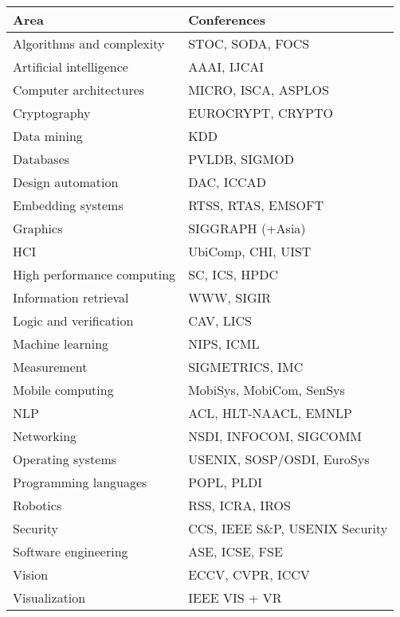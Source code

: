 \begin{tabular}{ll}
\toprule
                       Area &                     Conferences \\
\midrule
  Algorithms and complexity &                STOC, SODA, FOCS \\
    Artificial intelligence &                     AAAI, IJCAI \\
     Computer architectures &             MICRO, ISCA, ASPLOS \\
               Cryptography &               EUROCRYPT, CRYPTO \\
                Data mining &                             KDD \\
                  Databases &                   PVLDB, SIGMOD \\
          Design automation &                      DAC, ICCAD \\
          Embedding systems &              RTSS, RTAS, EMSOFT \\
                   Graphics &                SIGGRAPH (+Asia) \\
                        HCI &              UbiComp, CHI, UIST \\
 High performance computing &                   SC, ICS, HPDC \\
      Information retrieval &                      WWW, SIGIR \\
     Logic and verification &                       CAV, LICS \\
           Machine learning &                      NIPS, ICML \\
                Measurement &                 SIGMETRICS, IMC \\
           Mobile computing &        MobiSys, MobiCom, SenSys \\
                        NLP &           ACL, HLT-NAACL, EMNLP \\
                 Networking &          NSDI, INFOCOM, SIGCOMM \\
          Operating systems &      USENIX, SOSP/OSDI, EuroSys \\
      Programming languages &                      POPL, PLDI \\
                   Robotics &                 RSS, ICRA, IROS \\
                   Security &  CCS, IEEE S\&P, USENIX Security \\
       Software engineering &                  ASE, ICSE, FSE \\
                     Vision &                ECCV, CVPR, ICCV \\
              Visualization &                   IEEE VIS + VR \\
\bottomrule
\end{tabular}

